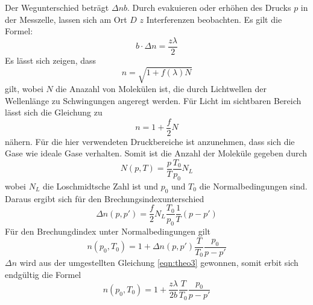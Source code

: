\FloatBarrier
Der Wegunterschied beträgt $\Delta n b$.
Durch evakuieren oder erhöhen des Drucks $p$ in der Messzelle, lassen sich am Ort $D$ $z$ Interferenzen beobachten.
Es gilt die Formel:
\begin{equation}
    b \cdot \Delta n = \frac{z \lambda}{2}
    \label{eqn:theo3}
\end{equation}
Es lässt sich zeigen, dass
\begin{equation}
    n = \sqrt{1+f(\lambda)N}
\end{equation}
gilt, wobei $N$ die Anazahl von Molekülen ist, die durch Lichtwellen der Wellenlänge zu Schwingungen angeregt werden.
Für Licht im sichtbaren Bereich lässt sich die Gleichung zu
\begin{equation}
    n = 1 + \frac{f}{2}N
\end{equation}
nähern.
Für die hier verwendeten Druckbereiche ist anzunehmen, dass sich die Gase wie ideale Gase verhalten.
Somit ist die Anzahl der Moleküle gegeben durch
\begin{equation}
    N(p,T) = \frac{p}{T} \frac{T_0}{p_0}N_L
\end{equation}
wobei $N_L$ die Loschmidtsche Zahl ist und $p_0$ und $T_0$ die Normalbedingungen sind.
Daraus ergibt sich für den Brechungsindexunterschied
\begin{equation}
    \Delta n(p,p') = \frac{f}{2} N_L \frac{T_0}{p_0}\frac{1}{T}(p-p')
\end{equation}
Für den Brechungdindex unter Normalbedingungen gilt
\begin{equation}
    n(p_0,T_0) = 1 + \Delta n(p,p') \frac{T}{T_0}\frac{p_0}{p-p'}
\end{equation}
$\Delta n$ wird aus der umgestellten Gleichung \eqref{eqn:theo3} gewonnen, somit erbit sich endgültig die Formel
\begin{equation}
    n(p_0,T_0) = 1 + \frac{z \lambda}{2b} \frac{T}{T_0} \frac{p_0}{p-p'}
    \label{eqn:gl2}
\end{equation}
